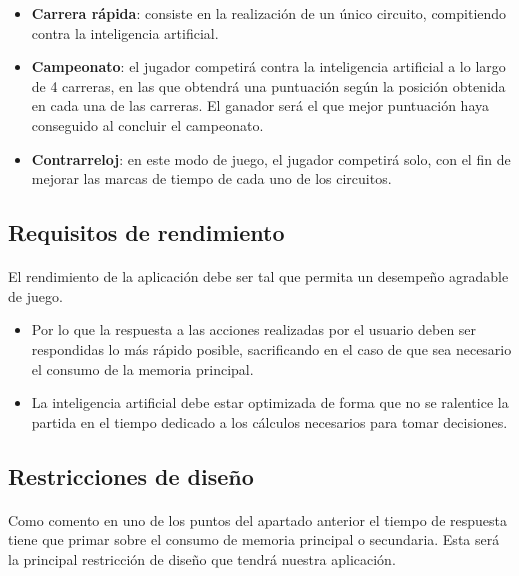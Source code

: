 \begin{itemize}
	\item \textbf{Carrera rápida}: consiste en la realización de un único circuito, compitiendo contra la inteligencia artificial.
	\item \textbf{Campeonato}: el jugador competirá contra la inteligencia artificial a lo largo de 4 carreras, en las que obtendrá una puntuación
	según la posición obtenida en cada una de las carreras. El ganador será el que mejor puntuación haya conseguido al concluir
	el campeonato.
	\item \textbf{Contrarreloj}: en este modo de juego, el jugador competirá solo, con el fin de mejorar las marcas de tiempo de cada uno de los 
	circuitos.
\end{itemize}


\subsection{Requisitos de rendimiento}

\paragraph{}
El rendimiento de la aplicación debe ser tal que permita un desempeño agradable de juego. 

\begin{itemize}
    \item Por lo que la respuesta a las acciones realizadas por el usuario deben ser respondidas lo más rápido posible,
    sacrificando en el caso de que sea necesario el consumo de la memoria principal.
    
    \item La inteligencia artificial debe estar optimizada de forma que no se ralentice la partida en el tiempo dedicado a los
    cálculos necesarios para tomar decisiones.
\end{itemize}
    

\subsection{Restricciones de diseño}

\paragraph{}
Como comento en uno de los puntos del apartado anterior el tiempo de respuesta tiene que primar sobre el consumo de 
memoria principal o secundaria. Esta será la principal restricción de diseño que tendrá nuestra aplicación.

